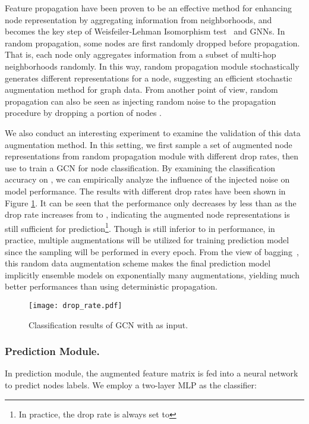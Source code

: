 {
Feature propagation have been proven to be an effective method for enhancing node representation by aggregating information from neighborhoods, and becomes the key step of Weisfeiler-Lehman Isomorphism test~\cite{shervashidze2011weisfeiler} and GNNs. In random propagation, some nodes are first randomly dropped before propagation. That is, each node only aggregates information from a subset of multi-hop neighborhoods randomly. In this way, random propagation module stochastically generates different representations for a node, suggesting an efficient stochastic augmentation method for graph data. From another point of view, random propagation can also be seen as injecting random noise to the propagation procedure by dropping a portion of nodes . 

We also conduct an interesting experiment to examine the validation of this data augmentation method. In this setting, we first sample a set of augmented node representations  from random propagation module with different drop rates, then use  to train a GCN for node classification. 
By examining the classification accuracy on , we can empirically analyze the influence of the injected noise on model performance. The results with different drop rates have been shown in Figure \ref{fig:redundancy}. It can be seen that the performance only decreases by less than  as the drop rate increases from  to , indicating the augmented node representations is still sufficient for prediction\footnote{In practice, the drop rate is always set to }. 
 Though   is still inferior to  in performance, in practice, multiple augmentations will be utilized for training prediction model since the sampling will be performed in every epoch. From the view of bagging~\cite{breiman1996bagging}, this random data augmentation scheme makes the final prediction model implicitly ensemble models on exponentially many augmentations, yielding much better performances than using deterministic propagation.
 
  


\begin{figure}
  		\centering
  		\texttt{[image: drop\_rate.pdf]}
  	\caption{Classification results of GCN with  as input.} 
  	\label{fig:redundancy}
\end{figure}
  






\subsubsection{Prediction Module.}
In prediction module, the augmented feature matrix  is fed into a neural network to predict nodes labels. We employ a two-layer MLP as the classifier:

}
